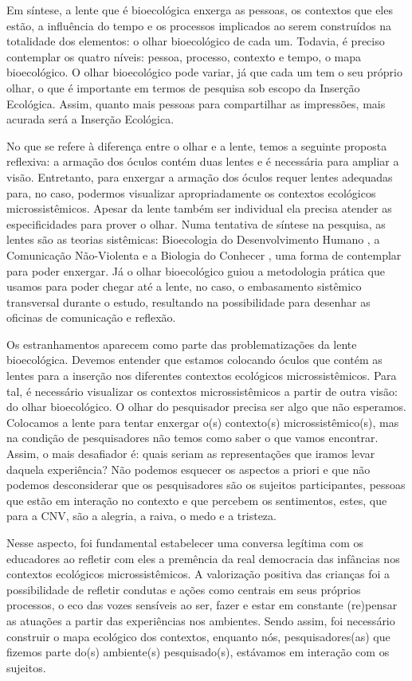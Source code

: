 \documentclass{textolivre}
\begin{document}
Em síntese, a lente que é bioecológica enxerga as pessoas, os contextos que eles estão, a influência do tempo e os processos implicados ao serem construídos na totalidade dos elementos: o olhar bioecológico de cada um. Todavia, é preciso contemplar os quatro níveis: pessoa, processo, contexto e tempo, o mapa bioecológico. O olhar bioecológico pode variar, já que cada um tem o seu próprio olhar, o que é importante em termos de pesquisa sob escopo da Inserção Ecológica. Assim, quanto mais pessoas para compartilhar as impressões, mais acurada será a Inserção Ecológica. 

No que se refere à diferença entre o olhar e a lente, temos a seguinte proposta reflexiva: a armação dos óculos contém duas lentes e é necessária para ampliar a visão. Entretanto, para enxergar a armação dos óculos requer lentes adequadas para, no caso, podermos visualizar apropriadamente os contextos ecológicos microssistêmicos. Apesar da lente também ser individual ela precisa atender as especificidades para prover o olhar. Numa tentativa de síntese na pesquisa, as lentes são as teorias sistêmicas: Bioecologia do Desenvolvimento Humano \cite{brofen2011}, a Comunicação Não-Violenta \cite{rosenberg2006} e a Biologia do Conhecer \cite{maturana2011}, uma forma de contemplar para poder enxergar. Já o olhar bioecológico guiou a metodologia prática que usamos para poder chegar até a lente, no caso, o embasamento sistêmico transversal durante o estudo, resultando na possibilidade para desenhar as oficinas de comunicação e reflexão.

Os estranhamentos aparecem como parte das problematizações da lente bioecológica. Devemos entender que estamos colocando óculos que contém as lentes para a inserção nos diferentes contextos ecológicos microssistêmicos. Para tal, é necessário visualizar os contextos microssistêmicos a partir de outra visão: do olhar bioecológico. O olhar do pesquisador precisa ser algo que não esperamos. Colocamos a lente para tentar enxergar o(s) contexto(s) microssistêmico(s), mas na condição de pesquisadores não temos como saber o que vamos encontrar. Assim, o mais desafiador é: quais seriam as representações que iramos levar daquela experiência? Não podemos esquecer os aspectos a priori e que não podemos desconsiderar que os pesquisadores são os sujeitos participantes, pessoas que estão em interação no contexto e que percebem os sentimentos, estes, que para a CNV, são a alegria, a raiva, o medo e a tristeza.

Nesse aspecto, foi fundamental estabelecer uma conversa legítima com os educadores ao refletir com eles a premência da real democracia das infâncias nos contextos ecológicos microssistêmicos. A valorização positiva das crianças foi a possibilidade de refletir condutas e ações como centrais em seus próprios processos, o eco das vozes sensíveis ao ser, fazer e estar em constante (re)pensar as atuações a partir das experiências nos ambientes. Sendo assim, foi necessário construir o mapa ecológico dos contextos, enquanto nós, pesquisadores(as) que fizemos parte do(s) ambiente(s) pesquisado(s), estávamos em interação com os sujeitos. 
\end{document}
